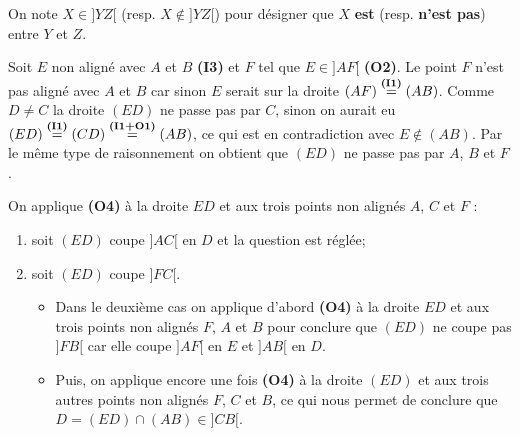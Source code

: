 \documentclass[a4paper,12pt,reqno]{amsart}
\begin{document}
\begin{solution}

  \begin{convention}
    On note $X \in ]YZ[$ (resp. $X \notin ]YZ[$) pour désigner que $X$ \textbf{est} (resp. \textbf{n'est pas}) entre $Y$ et $Z$.
  \end{convention}

  Soit $E$ non aligné avec $A$ et $B$ \textbf{(I3)} et $F$ tel que $E \in ]AF[$ \textbf{(O2)}. Le point $F$ n'est pas aligné avec $A$ et $B$ car sinon $E$ serait sur la droite $(AF)\overset{\tiny\textbf{(I1)}}{=}(AB)$. Comme $D\neq C$ la droite $(ED)$ ne passe pas par $C$, sinon on aurait eu $(ED)\overset{\tiny\textbf{(I1)}}{=}(CD)\overset{\tiny\textbf{(I1+O1)}}{=}(AB)$, ce qui est en contradiction avec $E \notin (AB)$. Par le même type de raisonnement on obtient que $(ED)$ ne passe pas par $A$, $B$ et $F$.

  On applique \textbf{(O4)} à la droite $ED$ et aux trois points non alignés $A$, $C$ et $F$ :
  \begin{enumerate}
    \item soit $(ED)$ coupe $]AC[$ en $D$ et la question est réglée;
    \item soit $(ED)$ coupe $]FC[$.
    \begin{itemize}
      \item Dans le deuxième cas on applique d'abord \textbf{(O4)} à la droite $ED$ et aux trois points non alignés $F$, $A$ et $B$ pour conclure que $(ED)$ ne coupe pas $]FB[$ car elle coupe $]AF[$ en $E$ et $]AB[$ en $D$.
      \item Puis, on applique encore une fois \textbf{(O4)} à la droite $(ED)$ et aux trois autres points non alignés $F$, $C$ et $B$, ce qui nous permet de conclure que $D = (ED)\cap(AB) \in ]CB[$.
    \end{itemize}
  \end{enumerate}
\end{solution}
\end{document}
